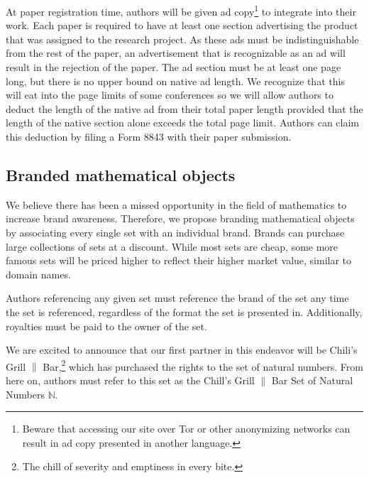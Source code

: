 At paper registration time, authors will be given ad copy\footnote{Beware that
  accessing our site over Tor or other anonymizing networks can result in ad
copy presented in another language.}
  to integrate into their work.
Each paper is required to have at least one section advertising the product
that was assigned to the research project.
As these ads must be indistinguishable from the rest of the paper, an
advertisement that is recognizable as an ad will result in the rejection of the
paper.
The ad section must be at least one page long, but there is no upper bound on
native ad length.
We recognize that this will eat into the page limits of some conferences so we
will allow authors to deduct the length of the native ad from their total paper
length provided that the length of the native section alone exceeds the total
page limit.
Authors can claim this deduction by filing a Form 8843 with their paper
submission.

\subsection{Branded mathematical objects}
\label{sec:brands}
We believe there has been a missed opportunity in the field of mathematics to
increase brand awareness.
Therefore, we propose branding mathematical objects by associating every single
set with an individual brand.
Brands can purchase large collections of sets at a discount.
While most sets are cheap, some more famous sets will be priced higher to
reflect their higher market value, similar to domain names.

Authors referencing any given set must reference the brand of the set any time
the set is referenced, regardless of the format the set is presented  in.
Additionally, royalties must be paid to the owner of the set.

We are excited to announce that our first partner in this endeavor will be
Chili's Grill $\|$ Bar,\footnote{The chill of severity and emptiness in every
bite.} which has purchased the rights to the set of natural
numbers.
From here on, authors must refer to this set as the Chill's Grill $\|$ Bar Set of
Natural Numbers \(\mathbb{N}\).

